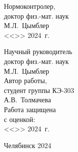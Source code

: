 \begin{adjustwidth}[]{0cm}{0cm}
\begin{center}
\begin{linespread}{1}
\parbox[t]{7cm}{
Нормоконтролер, \\
доктор физ.-мат. наук\\[0.5em]
\underfield{} М.Л.~Цымблер \\[0.5em]
<<\underline{\qquad}>>\underfield{} 2024~г.
}
\hfill
\parbox[t]{7cm}{
\vspace{-0.3cm} 
Научный руководитель \\
доктор физ.-мат. наук\\[0.5em]
\underfield{} М.Л.~Цымблер \\[2.5em]
Автор работы, \\
студент группы КЭ-303\\[0.5em]
\underfield{} А.В.~Толмачева \\[2.5em]
Работа защищена\\
с оценкой: \underfield{}\\[0.5em]
<<\underline{\qquad}>>\underfield{} 2024~г.
}

\vspace{2.5em}

Челябинск 2024

\end{linespread}
\end{center}
\end{adjustwidth}

\pagebreak
